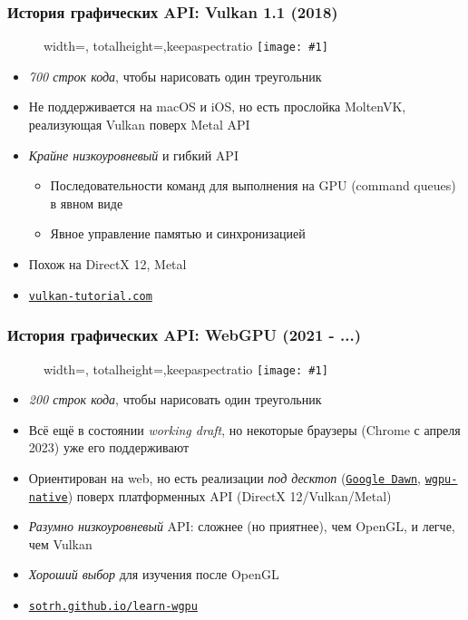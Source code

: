 \documentclass[10pt]{beamer}
\newcommand{\slideimage}[1]{
  \begin{figure}
    \begin{adjustbox}{width=\textwidth, totalheight=\textheight-2\baselineskip-2\baselineskip,keepaspectratio}
      \texttt{[image: \#1]}
    \end{adjustbox}
  \end{figure}
}
\begin{document}
\begin{frame}
\frametitle{История графических API: Vulkan 1.1 (2018)}
\slideimage{vulkan.png}
\begin{itemize}
\item \textit{700 строк кода}, чтобы нарисовать один треугольник
\pause
\item Не поддерживается на macOS и iOS, но есть прослойка MoltenVK, реализующая Vulkan поверх Metal API
\pause
\item \textit{Крайне низкоуровневый} и гибкий API
\begin{itemize}
\item Последовательности команд для выполнения на GPU (command queues) в явном виде
\item Явное управление памятью и синхронизацией
\end{itemize}
\pause
\item Похож на DirectX 12, Metal
\item \href{https://vulkan-tutorial.com}{\nolinkurl{vulkan-tutorial.com}}
\end{itemize}
\end{frame}

\begin{frame}
\frametitle{История графических API: WebGPU (2021 - ...)}
\slideimage{webgpu.png}
\begin{itemize}
\item \textit{200 строк кода}, чтобы нарисовать один треугольник
\pause
\item Всё ещё в состоянии \textit{working draft}, но некоторые браузеры (Chrome с апреля 2023) уже его поддерживают
\pause
\item Ориентирован на web, но есть реализации \textit{под десктоп} (\href{https://dawn.googlesource.com/dawn/+/refs/heads/chromium-gpu-experimental/README.md}{\texttt{Google Dawn}}, \href{https://github.com/gfx-rs/wgpu-native}{\nolinkurl{wgpu-native}}) поверх платформенных API (DirectX 12/Vulkan/Metal)
\pause
\item \textit{Разумно низкоуровневый} API: сложнее (но приятнее), чем OpenGL, и легче, чем Vulkan
\item \textit{Хороший выбор} для изучения после OpenGL
\item \href{https://sotrh.github.io/learn-wgpu/}{\nolinkurl{sotrh.github.io/learn-wgpu}}
\end{itemize}
\end{frame}
\end{document}
